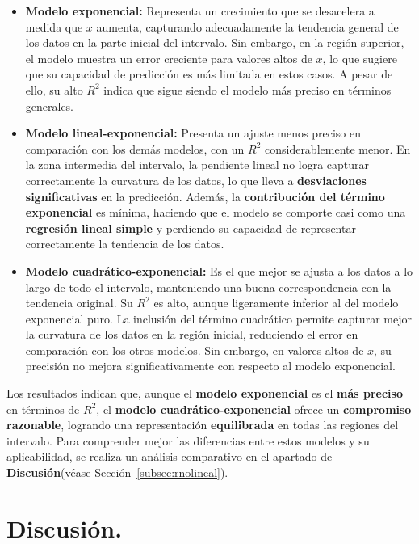 \documentclass{article}
\begin{document}
\begin{itemize}
    \item \textbf{Modelo exponencial:} Representa un crecimiento que se desacelera a medida que $x$ aumenta, capturando adecuadamente la tendencia general de los datos en la parte inicial del intervalo. Sin embargo, en la región superior, el modelo muestra un error creciente para valores altos de $x$, lo que sugiere que su capacidad de predicción es más limitada en estos casos. A pesar de ello, su alto $R^2$ indica que sigue siendo el modelo más preciso en términos generales.

    \item \textbf{Modelo lineal-exponencial:} Presenta un ajuste menos preciso en comparación con los demás modelos, con un $R^2$ considerablemente menor. En la zona intermedia del intervalo, la pendiente lineal no logra capturar correctamente la curvatura de los datos, lo que lleva a \textbf{desviaciones significativas} en la predicción. Además, la \textbf{contribución del término exponencial} es mínima, haciendo que el modelo se comporte casi como una \textbf{regresión lineal simple} y perdiendo su capacidad de representar correctamente la tendencia de los datos.

    \item \textbf{Modelo cuadrático-exponencial:} Es el que mejor se ajusta a los datos a lo largo de todo el intervalo, manteniendo una buena correspondencia con la tendencia original. Su $R^2$ es alto, aunque ligeramente inferior al del modelo exponencial puro. La inclusión del término cuadrático permite capturar mejor la curvatura de los datos en la región inicial, reduciendo el error en comparación con los otros modelos. Sin embargo, en valores altos de $x$, su precisión no mejora significativamente con respecto al modelo exponencial.
\end{itemize}

Los resultados indican que, aunque el \textbf{modelo exponencial} es el \textbf{más preciso} en términos de $R^2$, el \textbf{modelo cuadrático-exponencial} ofrece un \textbf{compromiso razonable}, logrando una representación \textbf{equilibrada} en todas las regiones del intervalo. Para comprender mejor las diferencias entre estos modelos y su aplicabilidad, se realiza un análisis comparativo en el apartado de \textbf{Discusión}(véase Sección~\ref{subsec:rnolineal}).

\newpage
\section{Discusión.}
\end{document}
